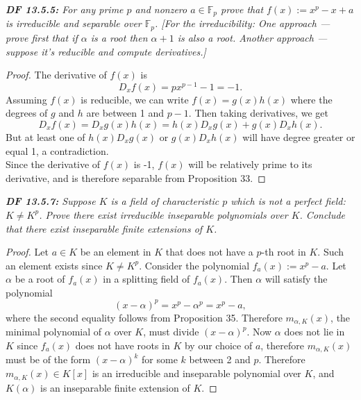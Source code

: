 \documentclass{article}
\begin{document}
\it \textbf{DF 13.5.5:} For any prime $p$ and nonzero $a\in\mathbb{F}_p$
  prove that $f(x):=x^p-x+a$ is irreducible and separable over $\mathbb{F}_p$.
  [For the irreducibility: One approach --- prove first that if $\alpha$ is
  a root then $\alpha+1$  is also a root. Another approach --- suppose it's
  reducible and compute derivatives.]

  \begin{proof}
    The derivative of $f(x)$ is
    \[D_x f(x) =px^{p-1}-1 =-1.\]
    Assuming $f(x)$ is reducible, we can write $f(x)=g(x)h(x)$ where the
    degrees of $g$ and $h$ are between 1 and $p-1$. Then taking
    derivatives, we get
    \[D_x f(x) =D_x g(x)h(x) =h(x)D_x g(x) +g(x)D_x h(x).\]
    But at least one of $h(x)D_x g(x)$ or $g(x)D_x h(x)$ will have degree
    greater or equal 1, a contradiction. \\

    Since the derivative of $f(x)$ is -1, $f(x)$ will be relatively prime
    to its derivative, and is therefore separable from Proposition 33.
  \end{proof}

\it \textbf{DF 13.5.7:} Suppose $K$ is a field of characteristic $p$ which
  is not a perfect field: $K\neq K^p$. Prove there exist irreducible
  inseparable polynomials over $K$. Conclude that there exist inseparable
  finite extensions of $K$.

  \begin{proof}
    Let $a\in K$ be an element in $K$ that does not have a $p$-th root in
    $K$. Such an element exists since $K\neq K^p$. Consider the polynomial
    $f_a(x):= x^p-a$. Let $\alpha$ be a root of $f_a(x)$ in a splitting field
    of $f_a(x)$. Then $\alpha$ will satisfy the polynomial
    \[(x-\alpha)^p=x^p-\alpha^p=x^p-a,\]
    where the second equality follows from Proposition 35. Therefore
    $m_{\alpha,K}(x)$, the minimal polynomial of $\alpha$ over $K$, must
    divide $(x-\alpha)^p$. Now $\alpha$ does not lie in $K$ since
    $f_a(x)$ does not have roots in $K$ by our choice of $a$, therefore
    $m_{\alpha,K}(x)$ must be of the form $(x-\alpha)^k$ for some $k$
    between 2 and $p$. Therefore $m_{\alpha,K}(x)\in K[x]$ is an
    irreducible and inseparable polynomial over $K$, and $K(\alpha)$ is an
    inseparable finite extension of $K$.
  \end{proof}
\end{document}
